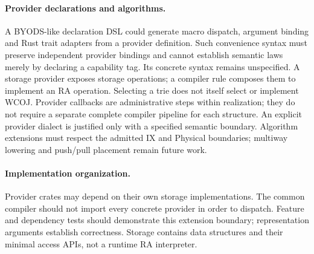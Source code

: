 \paragraph{Provider declarations and algorithms.}
A BYODS-like declaration DSL could generate macro dispatch, argument binding
and Rust trait adapters from a provider definition. Such convenience syntax
must preserve independent provider bindings and cannot establish semantic laws
merely by declaring a capability tag. Its concrete syntax remains unspecified.
A storage provider exposes storage operations; a compiler rule composes them
to implement an RA operation. Selecting a trie does not itself select or
implement WCOJ. Provider callbacks are administrative steps within realization;
they do not require a separate complete compiler pipeline for each structure.
An explicit provider dialect is justified only with a specified semantic
boundary. Algorithm extensions must respect the admitted IX and Physical
boundaries; multiway lowering and push/pull placement remain future work.

\paragraph{Implementation organization.}
Provider crates may depend on their own storage implementations. The common
compiler should not import every concrete provider in order to dispatch.
Feature and dependency tests should demonstrate this extension boundary;
representation arguments establish correctness. Storage contains data
structures and their minimal access APIs, not a runtime RA interpreter.
